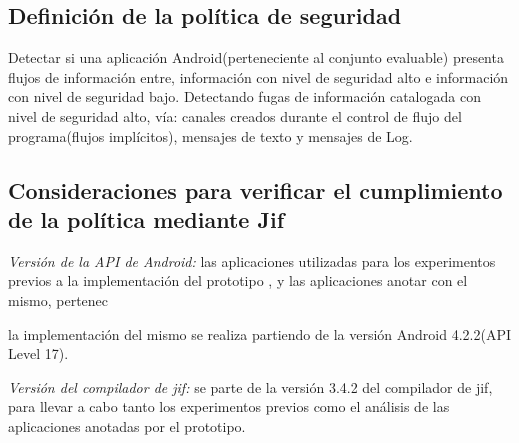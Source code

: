 \subsection{Definición de la política de seguridad}
Detectar si una aplicación Android(perteneciente al conjunto evaluable) presenta
flujos de información entre, información con nivel de seguridad alto e
información con nivel de seguridad bajo.\newline 
Detectando fugas de información catalogada con nivel de seguridad alto, vía:
canales creados durante el control de flujo del programa(flujos implícitos),
mensajes de texto y mensajes de Log.\newline 

\subsection{Consideraciones para verificar el cumplimiento de la política
mediante Jif} 
\textit{Versión de la API de Android:}\newline
las aplicaciones utilizadas para los experimentos previos a la implementación
del prototipo , y las aplicaciones anotar con el mismo, pertenec


la implementación
del mismo se realiza partiendo de la versión Android 4.2.2(API Level 17).

\textit{Versión del compilador de jif:}\newline
se parte de la versión 3.4.2 del compilador de jif, para llevar a cabo tanto los
experimentos previos como el análisis de las aplicaciones anotadas por el
prototipo.

